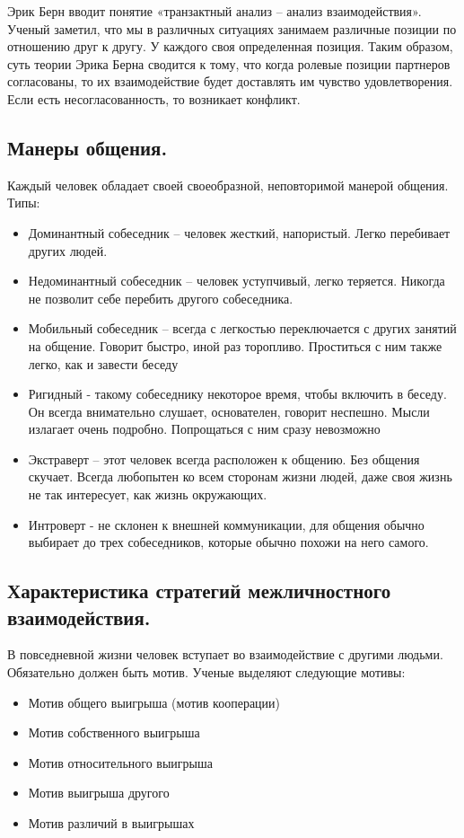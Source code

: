Эрик Берн вводит понятие «транзактный анализ – анализ взаимодействия».
Ученый заметил, что мы в различных ситуациях занимаем различные позиции по отношению друг к другу. У каждого своя определенная позиция. Таким образом, суть теории Эрика Берна сводится к тому, что когда ролевые позиции партнеров согласованы, то их взаимодействие будет доставлять им чувство удовлетворения. Если есть несогласованность, то возникает конфликт.

\subsection{Манеры общения.}
Каждый человек обладает своей своеобразной, неповторимой манерой общения.
Типы:
\begin{itemize}
    \item Доминантный собеседник – человек жесткий, напористый. Легко перебивает других людей.
    \item Недоминантный собеседник – человек уступчивый, легко теряется. Никогда не позволит себе перебить другого собеседника. 
    \item Мобильный собеседник – всегда с легкостью переключается с других занятий на общение. Говорит быстро, иной раз торопливо. Проститься с ним также легко, как и завести беседу
    \item Ригидный  - такому собеседнику некоторое время, чтобы включить в беседу. Он всегда внимательно слушает, основателен, говорит неспешно. Мысли излагает очень подробно. Попрощаться с ним сразу невозможно 
    \item Экстраверт – этот человек всегда расположен к общению. Без общения скучает. Всегда любопытен ко всем сторонам жизни людей, даже своя жизнь не так интересует, как жизнь окружающих.
    \item Интроверт  - не склонен к внешней коммуникации, для общения обычно выбирает до трех собеседников, которые обычно похожи на него самого.
\end{itemize}

\subsection{Характеристика стратегий межличностного взаимодействия.}
В повседневной жизни человек вступает во взаимодействие с другими людьми.
Обязательно должен быть мотив. Ученые выделяют следующие мотивы:
\begin{itemize}
    \item Мотив общего выигрыша (мотив кооперации) 
    \item Мотив собственного выигрыша 
    \item Мотив относительного выигрыша 
    \item Мотив выигрыша другого
    \item Мотив различий в выигрышах
\end{itemize}

